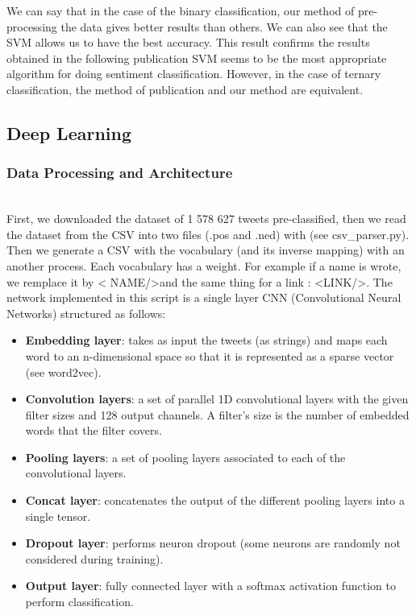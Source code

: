 \documentclass{acmtog} %
\begin{document}
We can say that in the case of the binary classification, our method of pre-processing the data gives better results than others. We can also see that the SVM allows us to have the best accuracy.  This result confirms the results obtained in the following publication \cite{Yaosef} SVM seems to be the most appropriate algorithm for doing sentiment classification.
However, in the case of ternary classification, the method of publication and our method are equivalent.


\subsection{Deep Learning}
\label{sec:dp}

\subsubsection{Data Processing and Architecture}
\label{subsub:dl}

~\\First, we downloaded the dataset of 1 578 627 tweets pre-classified, then we read the dataset from the CSV into two files (.pos and .ned) with (see csv\_parser.py). Then we generate a CSV with the vocabulary (and its inverse mapping) with an another process. Each vocabulary has a weight.
For example if a name is wrote, we remplace it by \textless 
NAME/\textgreater and the same thing for a link : \textless LINK/\textgreater.
The network implemented in this script is a single layer CNN (Convolutional Neural Networks)  structured as follows:
\begin{itemize}
\item  \textbf{Embedding layer}: takes as input the tweets (as strings) and maps each word to an n-dimensional space so that it is represented as a sparse vector (see word2vec).
\item  \textbf{Convolution layers}: a set of parallel 1D convolutional layers with the given filter sizes and 128 output channels. A filter's size is the number of embedded words that the filter covers.
\item  \textbf{Pooling layers}: a set of pooling layers associated to each of the convolutional layers.
\item  \textbf{Concat layer}: concatenates the output of the different pooling layers into a single tensor.
\item  \textbf{Dropout layer}: performs neuron dropout (some neurons are randomly not considered during training).
\item  \textbf{Output layer}: fully connected layer with a softmax activation function to perform classification.
\end{itemize}
\end{document}
